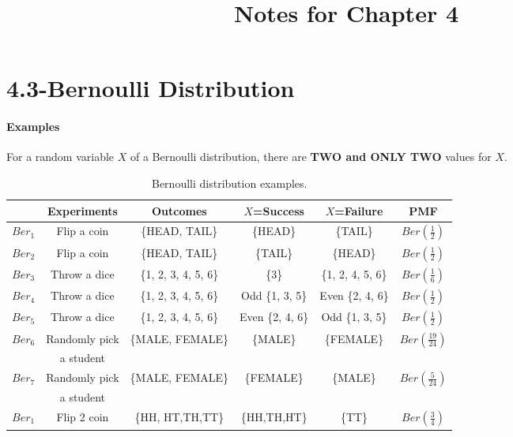 \documentclass{article} %
\title{Notes for Chapter 4}
\begin{document}
\maketitle

\section*{4.3-Bernoulli Distribution}
\paragraph*{Examples} For a random variable $X$ of a Bernoulli distribution, there are {\bf TWO and ONLY TWO} values for $X$. 
\begin{table}[h!]
\begin{center}
\renewcommand{\arraystretch}{1.5}
\begin{tabular}{|c|c|c|c|c|c|} \hline
& Experiments & Outcomes & $X$=Success & $X$=Failure & PMF \\ \hline 
$Ber_1$ & Flip a coin & \{HEAD, TAIL\} & \{HEAD\} & \{TAIL\} & $Ber(\frac{1}{2})$ \\ \hline
$Ber_2$ & Flip a coin & \{HEAD, TAIL\} & \{TAIL\} & \{HEAD\} & $Ber(\frac{1}{2})$ \\ \hline
$Ber_3$ & Throw a dice & \{1, 2, 3, 4, 5, 6\} & \{3\} & \{1, 2, 4, 5, 6\} & $Ber(\frac{1}{6})$ \\ \hline
$Ber_4$ & Throw a dice & \{1, 2, 3, 4, 5, 6\} & Odd \{1, 3, 5\} & Even \{2, 4, 6\} & $Ber(\frac{1}{2})$ \\ \hline
$Ber_5$ & Throw a dice & \{1, 2, 3, 4, 5, 6\} & Even \{2, 4, 6\} & Odd \{1, 3, 5\} & $Ber(\frac{1}{2})$ \\ \hline
\multirow{2}{*}{$Ber_6$} & Randomly pick & \multirow{2}{*}{\{MALE, FEMALE\}} & \multirow{2}{*}{\{MALE\}} & \multirow{2}{*}{\{FEMALE\}} & \multirow{2}{*}{$Ber(\frac{19}{24})$} \\
& a student & & & & \\ \hline
\multirow{2}{*}{$Ber_7$} & Randomly pick & \multirow{2}{*}{\{MALE, FEMALE\}} & \multirow{2}{*}{\{FEMALE\}} & \multirow{2}{*}{\{MALE\}} & \multirow{2}{*}{$Ber(\frac{5}{24})$} \\
& a student& & & & \\
\hline
$Ber_1$ & Flip 2 coin & \{HH, HT,TH,TT\} & \{HH,TH,HT\} & \{TT\} & $Ber(\frac{3}{4})$ \\ \hline
\end{tabular}
\caption{Bernoulli distribution examples.}
\label{Ta:ber}
\end{center}
\end{table}
\end{document}
